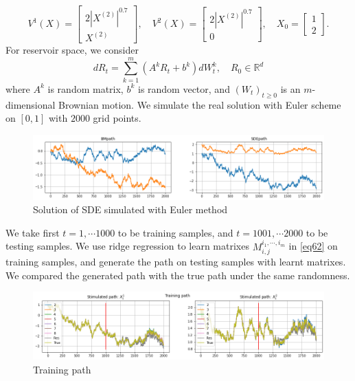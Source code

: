 \documentclass[12pt]{report}
\theoremstyle{definition}
\theoremstyle{remark}
\newcommand{\R}{\mathbb{R}}
\begin{document}
\begin{equation*}
  V^{1}(X) = \begin{bmatrix}
    2|X^{(2)}|^{0.7}\\
    X^{(2)}
  \end{bmatrix},\quad 
  V^{2}(X) = \begin{bmatrix}
    2|X^{(2)}|^{0.7}\\
    0
  \end{bmatrix},\quad 
  X_{0} = \begin{bmatrix}
    1\\
    2
  \end{bmatrix}.
\end{equation*}
For reservoir space, we consider 
\begin{equation}
  dR_{t} = \sum_{k=1}^{m}(A^{k}R_{t} + b^{k})dW^{k}_{t},\quad R_{0}\in\R^{d}
\end{equation}
where $A^{k}$ is random matrix, $b^{k}$ is random vector, and $(W_{t})_{t\geq 0}$ is an $m$-dimensional Brownian motion. We simulate the real solution with Euler scheme on $[0,1]$ with $2000$ grid points. 
\begin{figure}[H]
    \centering
    \includegraphics[width=\textwidth]{figs/res1.png}
    \caption{Solution of SDE simulated with Euler method}
\end{figure}
We take first $t=1,\cdots 1000$ to be training samples, and $t=1001,\cdots 2000$ to be testing samples. We use ridge regression to learn matrixes $M^{i_{1},\cdots,i_{m}}_{i,j}$ in \eqref{eq62} on training samples, and generate the path on testing samples with learnt matrixes. We compared the generated path with the true path under the same randomness. 
\begin{figure}[H]
    \centering
    \includegraphics[width=\textwidth]{figs/res2.png}
    \caption{Training path}
\end{figure}
\end{document}
